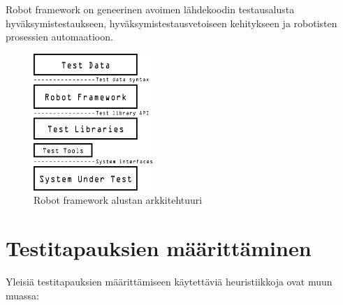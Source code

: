   Robot framework on geneerinen avoimen lähdekoodin testausalusta hyväksymistestaukseen, hyväksymistestausvetoiseen kehitykseen ja robotisten prosessien automaatioon.

  \begin{figure}[H]
    \centering
    \includegraphics[width=0.4\textwidth]{assets/robot-architecture.png}
    \caption{Robot framework alustan arkkitehtuuri}
    \label{fig:robot-architecture}
  \end{figure}

\section{Testitapauksien määrittäminen} \label{ch:08_testitapauksien_maarittaminen}

  Yleisiä testitapauksien määrittämiseen käytettäviä heuristiikkoja ovat muun muassa:

